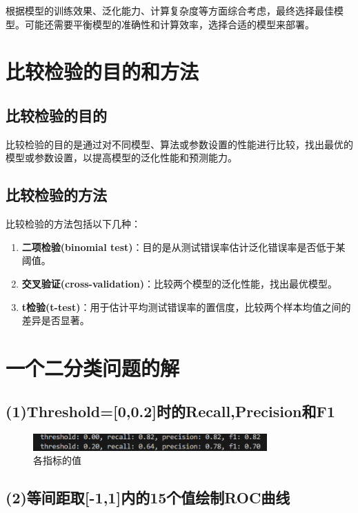 \documentclass{article}
\begin{document}
根据模型的训练效果、泛化能力、计算复杂度等方面综合考虑，最终选择最佳模型。可能还需要平衡模型的准确性和计算效率，选择合适的模型来部署。

\section{比较检验的目的和方法}
\subsection{比较检验的目的}
比较检验的目的是通过对不同模型、算法或参数设置的性能进行比较，找出最优的模型或参数设置，以提高模型的泛化性能和预测能力。
\subsection{比较检验的方法}
比较检验的方法包括以下几种：
\begin{enumerate}
    \item \textbf{二项检验(binomial test)}：目的是从测试错误率估计泛化错误率是否低于某阈值。
    \item \textbf{交叉验证(cross-validation)}：比较两个模型的泛化性能，找出最优模型。
    \item \textbf{t检验(t-test)}：用于估计平均测试错误率的置信度，比较两个样本均值之间的差异是否显著。
\end{enumerate}

\section{一个二分类问题的解}
\subsection{(1)Threshold=[0,0.2]时的Recall,Precision和F1}

\begin{figure}[h]
    \centering
    \includegraphics[width=0.8\textwidth]{Figure_2.png}
    \caption{各指标的值}
\end{figure}

\subsection{(2)等间距取[-1,1]内的15个值绘制ROC曲线}
\end{document}
